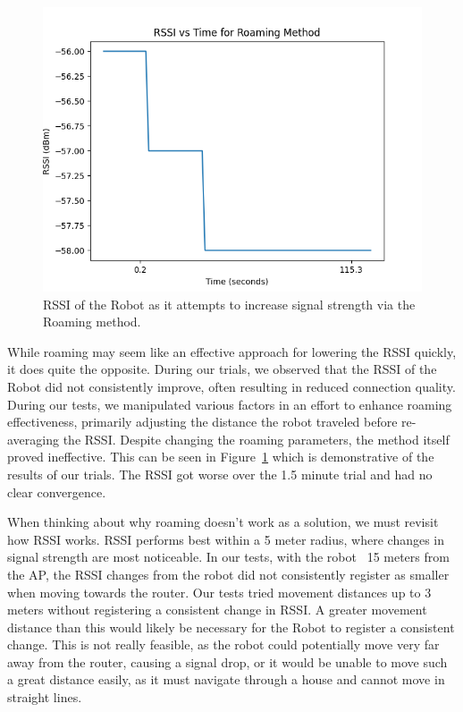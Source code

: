 \begin{figure}[tp]
\centering
\includegraphics[scale=0.5]{figures/rssi_roaming}
\caption{RSSI of the Robot as it attempts to increase signal strength via the Roaming method. }
\label{fig:rssi_roaming}
\end{figure}

While roaming may seem like an effective approach for lowering the RSSI quickly, it does quite the opposite. During our trials, we observed that the RSSI of the Robot did not consistently improve, often resulting in reduced connection quality. During our tests, we manipulated various factors in an effort to enhance roaming effectiveness, primarily adjusting the distance the robot traveled before re-averaging the RSSI. Despite changing the roaming parameters, the method itself proved ineffective. This can be seen in Figure~\ref{fig:rssi_roaming} which is demonstrative of the results of our trials. The RSSI got worse over the 1.5 minute trial and had no clear convergence. 

When thinking about why roaming doesn’t work as a solution, we must revisit how RSSI works. RSSI performs best within a 5 meter radius, where changes in signal strength are most noticeable. In our tests, with the robot ~15 meters from the AP, the RSSI changes from the robot did not consistently register as smaller when moving towards the router. Our tests tried movement distances up to 3 meters without registering a consistent change in RSSI. A greater movement distance than this would likely be necessary for the Robot to register a consistent change. This is not really feasible, as the robot could potentially move very far away from the router, causing a signal drop, or it would be unable to move such a great distance easily, as it must navigate through a house and cannot move in straight lines.
